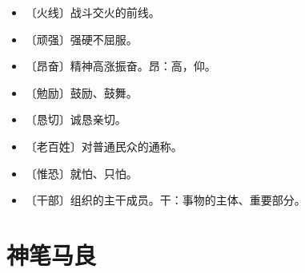 \documentclass[12pt,UTF-8,openany]{ctexbook}
\begin{document}
\vspace{-1em}

\begin{itemize}
    \setlength\itemsep{-0.2em}
    \item 〔火线〕战斗交火的前线。
    \item 〔顽强〕强硬不屈服。
    \item 〔昂奋〕精神高涨振奋。昂：高，仰。
    \item 〔勉励〕鼓励、鼓舞。
    \item 〔恳切〕诚恳亲切。
    \item 〔老百姓〕对普通民众的通称。
    \item 〔惟恐〕就怕、只怕。
    \item 〔干部〕组织的主干成员。干：事物的主体、重要部分。
\end{itemize}

\chapter{神笔马良}
\end{document}
